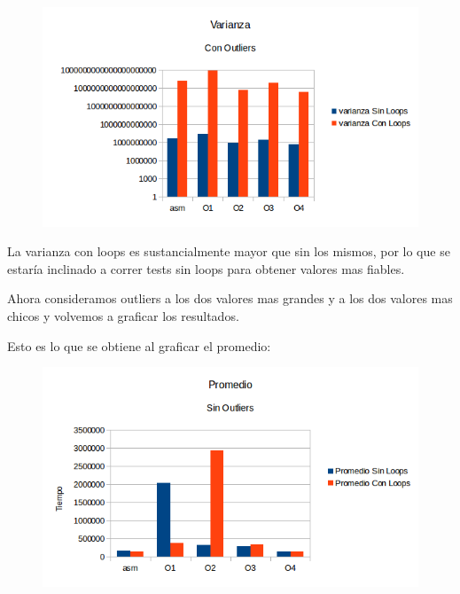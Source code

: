 \documentclass[a4paper]{article}
\begin{document}
\begin{figure}[h!]
  \begin{center}
	\includegraphics[scale=0.66]{Graficos1.4/1.3/VCO.png}
	\label{nombreparareferenciar2}
  \end{center}
\end{figure}

La varianza con loops es sustancialmente mayor que sin los mismos, por lo que se estaría inclinado a correr tests sin loops para obtener valores mas fiables.

Ahora consideramos outliers a los dos valores mas grandes y a los dos valores mas chicos y volvemos a graficar los resultados.

Esto es lo que se obtiene al graficar el promedio:

\begin{figure}[h!]
  \begin{center}
	\includegraphics[scale=0.66]{Graficos1.4/1.3/PSO.png}
	\label{nombreparareferenciar3}
  \end{center}
\end{figure}
\end{document}
